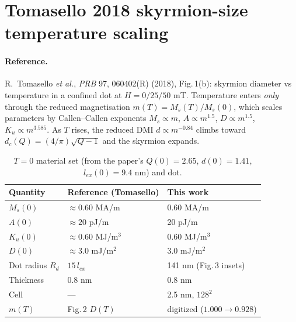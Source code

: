 \documentclass[11pt]{article}
\begin{document}
\clearpage
\section{Tomasello 2018 skyrmion-size temperature scaling}
\label{sec:tomasello}

\paragraph{Reference.} R.\ Tomasello \emph{et al.}, \emph{PRB} 97,
060402(R) (2018), Fig.\,1(b): skyrmion diameter vs temperature in a
confined dot at $H=0/25/50$ mT. Temperature enters \emph{only}
through the reduced magnetisation $m(T)=M_s(T)/M_s(0)$, which scales
parameters by Callen--Callen exponents
$M_s\!\propto\!m$, $A\!\propto\!m^{1.5}$, $D\!\propto\!m^{1.5}$,
$K_u\!\propto\!m^{3.585}$. As $T$ rises, the reduced DMI
$d\propto m^{-0.84}$ climbs toward $d_c(Q)=(4/\pi)\sqrt{Q-1}$ and
the skyrmion expands.

\begin{table}[htbp]
\centering
\caption{$T{=}0$ material set (from the paper's $Q(0){=}2.65$,
$d(0){=}1.41$, $l_{ex}(0){=}9.4$ nm) and dot.}
\begin{tabular}{@{}lll@{}}
\toprule
Quantity & Reference (Tomasello) & This work \\
\midrule
$M_s(0)$        & ${\approx}0.60$ MA/m & 0.60 MA/m \\
$A(0)$          & ${\approx}20$ pJ/m   & 20 pJ/m \\
$K_u(0)$        & ${\approx}0.60$ MJ/m$^3$ & 0.60 MJ/m$^3$ \\
$D(0)$          & ${\approx}3.0$ mJ/m$^2$  & 3.0 mJ/m$^2$ \\
Dot radius $R_d$& $15\,l_{ex}$ & 141 nm (Fig.\,3 insets) \\
Thickness       & 0.8 nm       & 0.8 nm \\
Cell            & ---          & 2.5 nm, $128^2$ \\
$m(T)$          & Fig.\,2 $D(T)$ & digitized ($1.000\!\to\!0.928$)\\
\bottomrule
\end{tabular}
\end{table}
\end{document}
